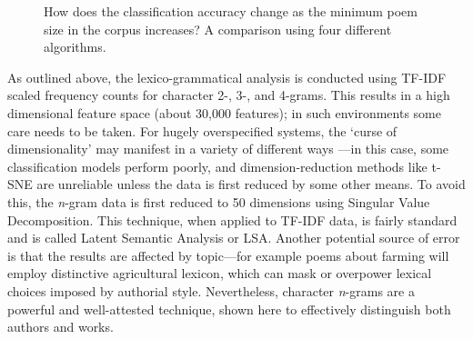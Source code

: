 \documentclass[twocolumn, switch, a4paper]{article} %
\begin{document}
\begin{figure}
  \caption{How does the classification accuracy change as the minimum poem
  size in the corpus increases? A comparison using four different algorithms.}
  \label{fig:ngram_acc}
  \centering
  \qquad
\end{figure}

As outlined above, the lexico-grammatical analysis is conducted using TF-IDF
scaled frequency counts for character 2-, 3-, and 4-grams. This results in a
high dimensional feature space (about 30,000 features); in such environments
some care needs to be taken. For hugely overspecified systems, the `curse of
dimensionality' may manifest in a variety of different ways
\cite{zimek_etal}---in this case, some classification models perform poorly,
and dimension-reduction methods like t-SNE are unreliable unless the data is
first reduced by some other means. To avoid this, the \emph{n}-gram data is
first reduced to 50 dimensions using Singular Value Decomposition. This
technique, when applied to TF-IDF data, is fairly standard and is called
Latent Semantic Analysis or LSA. Another potential source of error is that the
results are affected by topic---for example poems about farming will employ
distinctive agricultural lexicon, which can mask or overpower lexical choices
imposed by authorial style. Nevertheless, character \emph{n}-grams are a
powerful and well-attested technique, shown here to effectively distinguish
both authors and works.
\end{document}

